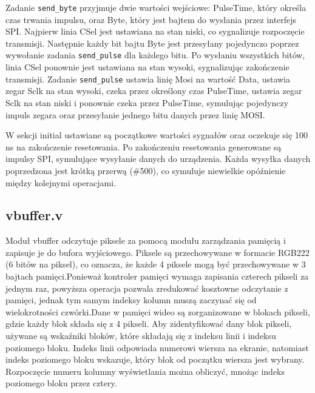 \documentclass[12pt, a4paper]{article}
\begin{document}
Zadanie \texttt{send_byte} przyjmuje dwie wartości wejściowe: PulseTime, który określa czas trwania impulsu, oraz Byte, który jest bajtem do wysłania przez interfejs SPI. Najpierw linia CSel jest ustawiana na stan niski, co sygnalizuje rozpoczęcie transmisji. Następnie każdy bit bajtu Byte jest przesyłany pojedynczo poprzez wywołanie zadania \texttt{send_pulse} dla każdego bitu. Po wysłaniu wszystkich bitów, linia CSel ponownie jest ustawiana na stan wysoki, sygnalizując zakończenie transmisji. Zadanie \texttt{send_pulse} ustawia linię Mosi na wartość Data, ustawia zegar Sclk na stan wysoki, czeka przez określony czas PulseTime, ustawia zegar Sclk na stan niski i ponownie czeka przez PulseTime, symulując pojedynczy impuls zegara oraz przesyłanie jednego bitu danych przez linię MOSI.

W sekcji initial ustawiane są początkowe wartości sygnałów oraz oczekuje się 100 ns na zakończenie resetowania. Po zakończeniu resetowania generowane są impulsy SPI, symulujące wysyłanie danych do urządzenia. Każda wysyłka danych poprzedzona jest krótką przerwą (\#500), co symuluje niewielkie opóźnienie między kolejnymi operacjami.

\subsection{vbuffer.v}
Moduł vbuffer odczytuje piksele za pomocą modułu zarządzania pamięcią i zapisuje je do bufora wyjściowego.
Piksele są przechowywane w formacie RGB222 (6 bitów na piksel), co oznacza, że każde 4 piksele mogą być przechowywane w 3 bajtach pamięci.Ponieważ kontroler pamięci wymaga zapisania czterech pikseli za jednym raz, powyższa operacja pozwala zredukować kosztowne odczytanie z pamięci, jednak tym samym indeksy kolumn muszą zaczynać się od wielokrotności czwórki.Dane w pamięci wideo są zorganizowane w blokach pikseli, gdzie każdy blok składa się z 4 pikseli. Aby zidentyfikować dany blok pikseli, używane są wskaźniki bloków, które składają się z indeksu linii i indeksu poziomego bloku. Indeks linii odpowiada numerowi wiersza na ekranie, natomiast indeks poziomego bloku wskazuje, który blok od początku wiersza jest wybrany. Rozpoczęcie numeru kolumny wyświetlania można obliczyć, mnożąc indeks poziomego bloku przez cztery.
\end{document}
